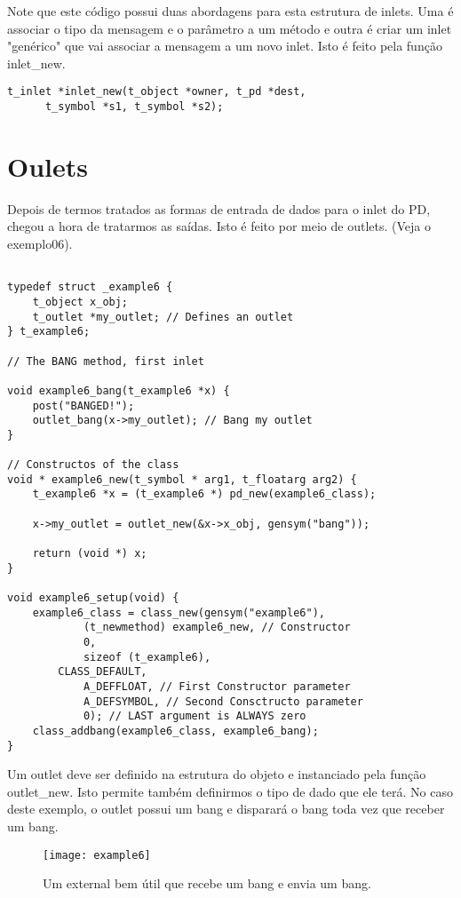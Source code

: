 Note que este código possui duas abordagens para esta estrutura de inlets. Uma
é associar o tipo da mensagem e o parâmetro a um método e outra é criar um
inlet "genérico" que vai associar a mensagem a um novo inlet. Isto é feito pela
função inlet\_new.

\begin{lstlisting}
t_inlet *inlet_new(t_object *owner, t_pd *dest,
      t_symbol *s1, t_symbol *s2);
\end{lstlisting}

\section{Oulets}

Depois de termos tratados as formas de entrada de dados para o inlet do PD,
chegou a hora de tratarmos as saídas. Isto é feito por meio de outlets. (Veja o
exemplo06).

\begin{lstlisting}

typedef struct _example6 {
    t_object x_obj;
    t_outlet *my_outlet; // Defines an outlet
} t_example6;

// The BANG method, first inlet

void example6_bang(t_example6 *x) {
    post("BANGED!");
    outlet_bang(x->my_outlet); // Bang my outlet
}

// Constructos of the class
void * example6_new(t_symbol * arg1, t_floatarg arg2) {
    t_example6 *x = (t_example6 *) pd_new(example6_class);

    x->my_outlet = outlet_new(&x->x_obj, gensym("bang"));

    return (void *) x;
}

void example6_setup(void) {
    example6_class = class_new(gensym("example6"),
            (t_newmethod) example6_new, // Constructor
            0, 
            sizeof (t_example6),
	    CLASS_DEFAULT,
            A_DEFFLOAT, // First Constructor parameter
            A_DEFSYMBOL, // Second Consctructo parameter
            0); // LAST argument is ALWAYS zero
    class_addbang(example6_class, example6_bang);
}
\end{lstlisting}

Um outlet deve ser definido na estrutura do objeto e instanciado pela função
outlet\_new. Isto permite também definirmos o tipo de dado que ele terá. No
caso deste exemplo, o outlet possui um bang e disparará o bang toda vez que
receber um bang.

\begin{figure}[h!]
	\centering
	\texttt{[image: example6]}
	\caption{Um external bem útil que recebe um bang e envia um bang.}
\end{figure}


